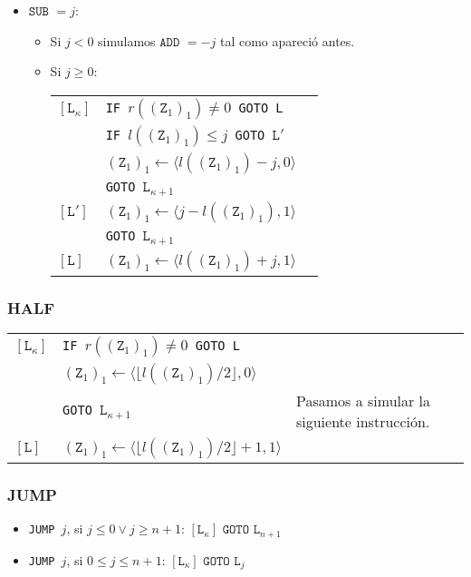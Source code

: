 \documentclass[twoside]{article}
\begin{document}
\begin{itemize}
\item $\texttt{SUB }=j$:

\begin{itemize}
\item Si $j<0$ simulamos $\texttt{ADD }=-j$ tal como apareció antes.

\item Si $j\geq 0$:

\begin{tabular}{l l l}
$[\texttt{L}_\kappa]$&\texttt{IF }$r((\texttt{Z}_1)_1)\neq 0$\texttt{ GOTO L}\\
&\texttt{IF }$l((\texttt{Z}_1)_1)\leq j$\texttt{ GOTO }$\texttt{L}'$&\\
&$(\texttt{Z}_1)_1\leftarrow \langle l((\texttt{Z}_1)_1)-j,0\rangle$\\
&\texttt{GOTO }$\texttt{L}_{\kappa+1}$& \\
$[\texttt{L}']$&$(\texttt{Z}_1)_1\leftarrow \langle j-l((\texttt{Z}_1)_1),1\rangle$\\
&\texttt{GOTO }$\texttt{L}_{\kappa+1}$& \\
$[\texttt{L}]$&$(\texttt{Z}_1)_1\leftarrow \langle l((\texttt{Z}_1)_1)+j,1\rangle$
\end{tabular}
\end{itemize}


\end{itemize}

\subsubsection{HALF}
\begin{tabular}{l l l}
$[\texttt{L}_\kappa]$ & \texttt{IF }$r((\texttt{Z}_1)_1)\neq 0$\texttt{ GOTO L}\\
&$(\texttt{Z}_1)_1\leftarrow\langle\lfloor l((\texttt{Z}_1)_1)/2\rfloor, 0\rangle$ &\\
&\texttt{GOTO }$\texttt{L}_{\kappa+1}$ & Pasamos a simular la siguiente instrucción.\\
$[\texttt{L}]$ & $(\texttt{Z}_1)_1\leftarrow\langle\lfloor l((\texttt{Z}_1)_1)/2\rfloor+1, 1\rangle$ & 
\end{tabular}

\newpage

\subsubsection{JUMP}
\begin{itemize}
\item \texttt{JUMP }$j$, si $j\leq 0\lor j\geq n+1$:
$[\texttt{L}_\kappa]\texttt{ GOTO }\texttt{L}_{n+1}$
\item \texttt{JUMP }$j$, si $0\leq j\leq n+1$:
$[\texttt{L}_\kappa]\texttt{ GOTO }\texttt{L}_{j}$
\end{itemize}
\end{document}
